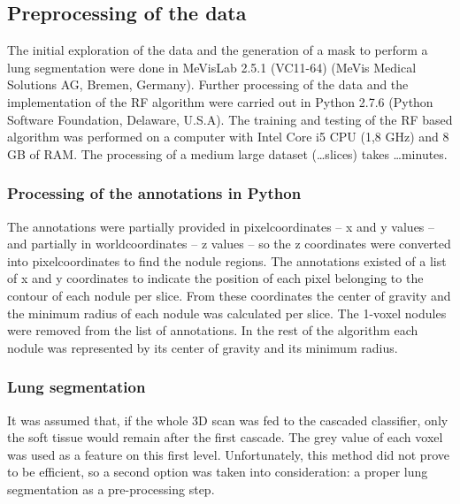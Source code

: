 \subsection{Preprocessing of the data}
The initial exploration of the data and the generation of a mask to perform a
lung segmentation were done in MeVisLab 2.5.1 (VC11-64) (MeVis Medical Solutions
AG, Bremen, Germany). Further processing of the data and the implementation of
the RF algorithm were carried out in Python 2.7.6 (Python Software Foundation,
Delaware, U.S.A).  The training and testing of the RF based algorithm was
performed on a computer with Intel Core i5 CPU (1,8 GHz) and 8 GB of RAM. The
processing of a medium large dataset (\ldots slices) takes \ldots minutes.

\subsubsection{Processing of the annotations in Python}
The annotations were partially provided in pixelcoordinates -- x and y values --
and partially in worldcoordinates -- z values -- so the z coordinates were
converted into pixelcoordinates to find the nodule regions. The annotations
existed of a list of x and y coordinates to indicate the position of each
pixel belonging to the contour of each nodule per slice. From these
coordinates the center of gravity and the minimum radius of each nodule was
calculated per slice. The 1-voxel nodules were removed from the list of
annotations. In the rest of the algorithm each nodule was represented by its
center of gravity and its minimum radius.

\subsubsection{Lung segmentation}
It was assumed that, if the whole 3D scan was fed to the cascaded classifier,
only the soft tissue would remain after the first cascade. The grey value of
each voxel was used as a feature on this first level.
Unfortunately, this method did not prove to be efficient, so a second option was
taken into consideration: a proper lung segmentation as a pre-processing step.

